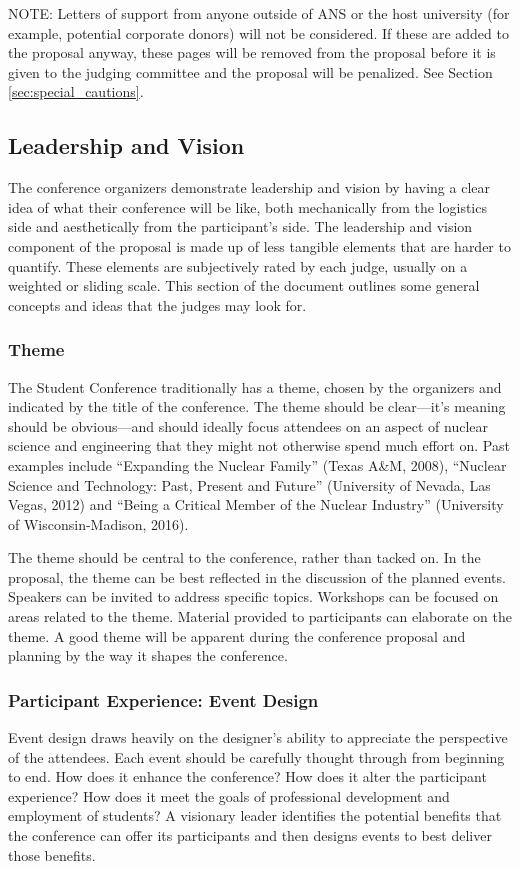 \documentclass[12pt]{article}
\begin{document}
NOTE: Letters of support from anyone outside of ANS or the host university (for example,
potential corporate donors) will not be considered. If these are added to the
proposal anyway, these pages will be removed from the proposal before it is given to
the judging committee and the proposal will be penalized. See Section \ref{sec:special_cautions}.

\subsection{Leadership and Vision} \label{sec:LandV2}
The conference organizers demonstrate leadership and vision by having a clear idea of
what their conference will be like, both mechanically from the logistics side and
aesthetically from the participant’s side. The leadership and vision component of the
proposal is made up of less tangible elements that are harder to quantify. These elements
are subjectively rated by each judge, usually on a weighted or sliding scale. This section
of the document outlines some general concepts and ideas that the judges may look for.


\subsubsection{Theme}
The Student Conference traditionally has a theme, chosen by the organizers and indicated
by the title of the conference. The theme should be clear---it's meaning should be obvious---and should ideally focus attendees on an aspect of nuclear science and
engineering that they might not otherwise spend much effort on. Past examples include
“Expanding the Nuclear Family” (Texas A\&M, 2008), “Nuclear Science and Technology: Past, Present and Future” (University of Nevada, Las Vegas, 2012) and “Being a Critical Member of the Nuclear Industry” (University of Wisconsin-Madison, 2016).

The theme should be central to the conference, rather than tacked on. In the proposal, the theme can be best reflected in the discussion of the planned events. Speakers can
be invited to address specific topics. Workshops can be focused on areas related to the
theme. Material provided to participants can elaborate on the theme. A good theme will be apparent during the conference proposal and planning by the way it shapes the conference.

\subsubsection{Participant Experience: Event Design}
Event design draws heavily on the designer’s ability to appreciate the perspective of the
attendees. Each event should be carefully thought through from beginning to end. How
does it enhance the conference? How does it alter the participant experience? How does
it meet the goals of professional development and employment of students? A visionary
leader identifies the potential benefits that the conference can offer its participants and
then designs events to best deliver those benefits.
\end{document}
